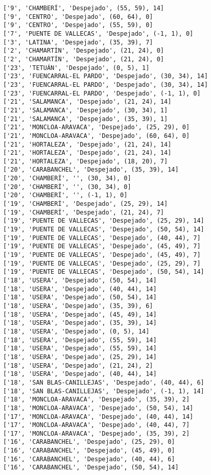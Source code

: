 \documentclass[11pt]{article}
\begin{document}
\begin{Verbatim}[commandchars=\\\{\}]
['9', 'CHAMBERÍ', 'Despejado', (55, 59), 14]
['9', 'CENTRO', 'Despejado', (60, 64), 0]
['9', 'CENTRO', 'Despejado', (55, 59), 0]
['7', 'PUENTE DE VALLECAS', 'Despejado', (-1, 1), 0]
['3', 'LATINA', 'Despejado', (35, 39), 7]
['2', 'CHAMARTÍN', 'Despejado', (21, 24), 0]
['2', 'CHAMARTÍN', 'Despejado', (21, 24), 0]
['23', 'TETUÁN', 'Despejado', (0, 5), 1]
['23', 'FUENCARRAL-EL PARDO', 'Despejado', (30, 34), 14]
['23', 'FUENCARRAL-EL PARDO', 'Despejado', (30, 34), 14]
['23', 'FUENCARRAL-EL PARDO', 'Despejado', (-1, 1), 0]
['21', 'SALAMANCA', 'Despejado', (21, 24), 14]
['21', 'SALAMANCA', 'Despejado', (30, 34), 1]
['21', 'SALAMANCA', 'Despejado', (35, 39), 1]
['21', 'MONCLOA-ARAVACA', 'Despejado', (25, 29), 0]
['21', 'MONCLOA-ARAVACA', 'Despejado', (60, 64), 0]
['21', 'HORTALEZA', 'Despejado', (21, 24), 14]
['21', 'HORTALEZA', 'Despejado', (21, 24), 14]
['21', 'HORTALEZA', 'Despejado', (18, 20), 7]
['20', 'CARABANCHEL', 'Despejado', (35, 39), 14]
['20', 'CHAMBERÍ', '', (30, 34), 0]
['20', 'CHAMBERÍ', '', (30, 34), 0]
['20', 'CHAMBERÍ', '', (-1, 1), 0]
['19', 'CHAMBERÍ', 'Despejado', (25, 29), 14]
['19', 'CHAMBERÍ', 'Despejado', (21, 24), 7]
['19', 'PUENTE DE VALLECAS', 'Despejado', (25, 29), 14]
['19', 'PUENTE DE VALLECAS', 'Despejado', (50, 54), 14]
['19', 'PUENTE DE VALLECAS', 'Despejado', (40, 44), 7]
['19', 'PUENTE DE VALLECAS', 'Despejado', (45, 49), 7]
['19', 'PUENTE DE VALLECAS', 'Despejado', (45, 49), 7]
['19', 'PUENTE DE VALLECAS', 'Despejado', (25, 29), 7]
['19', 'PUENTE DE VALLECAS', 'Despejado', (50, 54), 14]
['18', 'USERA', 'Despejado', (50, 54), 14]
['18', 'USERA', 'Despejado', (40, 44), 14]
['18', 'USERA', 'Despejado', (50, 54), 14]
['18', 'USERA', 'Despejado', (35, 39), 6]
['18', 'USERA', 'Despejado', (45, 49), 14]
['18', 'USERA', 'Despejado', (35, 39), 14]
['18', 'USERA', 'Despejado', (0, 5), 14]
['18', 'USERA', 'Despejado', (55, 59), 14]
['18', 'USERA', 'Despejado', (55, 59), 14]
['18', 'USERA', 'Despejado', (25, 29), 14]
['18', 'USERA', 'Despejado', (21, 24), 2]
['18', 'USERA', 'Despejado', (40, 44), 14]
['18', 'SAN BLAS-CANILLEJAS', 'Despejado', (40, 44), 6]
['18', 'SAN BLAS-CANILLEJAS', 'Despejado', (-1, 1), 14]
['18', 'MONCLOA-ARAVACA', 'Despejado', (35, 39), 2]
['18', 'MONCLOA-ARAVACA', 'Despejado', (50, 54), 14]
['17', 'MONCLOA-ARAVACA', 'Despejado', (40, 44), 14]
['17', 'MONCLOA-ARAVACA', 'Despejado', (40, 44), 7]
['17', 'MONCLOA-ARAVACA', 'Despejado', (35, 39), 2]
['16', 'CARABANCHEL', 'Despejado', (25, 29), 0]
['16', 'CARABANCHEL', 'Despejado', (45, 49), 0]
['16', 'CARABANCHEL', 'Despejado', (40, 44), 6]
['16', 'CARABANCHEL', 'Despejado', (50, 54), 14]

\end{Verbatim}
\end{document}
